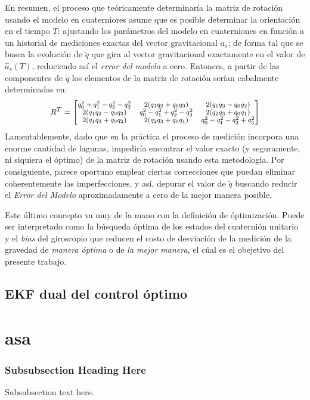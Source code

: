 \documentclass[conference]{IEEEtran}
\begin{document}
En resumen, el proceso que teóricamente determinaría la matriz de rotación usando el modelo en cuaterniores asume que es posible determinar la orientación en el tiempo $T$: ajustando los parámetros del modelo en cuaterniones en función a un historial de mediciones exactas del vector gravitacional $a_s$; de forma tal que se busca la evolución de $\breve{q}$ que gira al vector gravitacional exactamente en el valor de $\hat{a}_s(T)$, reduciendo así el \emph{error del modelo} a cero. Entonces, a partir de las componentes de $\breve{q}$ los elementos de la matriz de rotación serían cabalmente determinadas  \cite{Sola2012} en:
\begin{equation}\label{modelo_ecc4}\scriptsize
R^T=\begin{bmatrix} q^2_0+q^2_1-q^2_2-q^2_3&2(q_1q_2+q_0q_3)&2(q_1q_3-q_0q_2)\\ 2(q_1q_2-q_0q_3)&q^2_0-q^2_1+q^2_2-q^2_3&2(q_2q_3+q_0q_1)\\ 2(q_1q_3+q_0q_2)&2(q_2q_3+q_0q_1)&q^2_0-q^2_1-q^2_2+q^2_3\\ \end{bmatrix}
\end{equation} 
Lamentablemente, dado que en la práctica el proceso de medición incorpora una enorme cantidad de lagunas, impediría encontrar el valor exacto (y seguramente, ni siquiera el óptimo) de la matriz de rotación usando esta metodología. Por consiguiente, parece oportuno emplear ciertas correcciones que puedan eliminar coherentemente las imperfecciones, y así, depurar el valor de $\breve{q}$ buscando reducir el \emph{Error del Modelo} aproximadamente a cero de la mejor manera posible.\par
Este último concepto va muy de la mano con la definición de óptimización. Puede ser interpretado como la búsqueda óptima de los estados del cuaternión unitario y el \emph{bias} del giroscopio que reducen el costo de desviación de la medición de la gravedad de \emph{manera óptima} o de \emph{la mejor manera}, el cúal es el obejetivo del presente trabajo.
\subsection{EKF dual del control óptimo}
\section{asa}
\cite{IEEEhowto:kopka}


\subsubsection{Subsubsection Heading Here}
Subsubsection text here.
\end{document}
